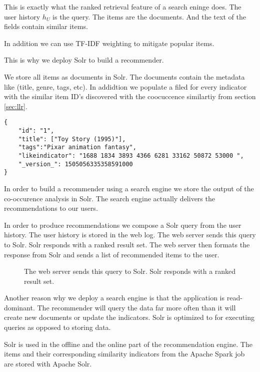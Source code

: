 This is exactly what the ranked retrieval feature of a search eninge does.
The user history $h_U$ is the query. The items are the documents. And the text of the fields contain similar items.

In addition we can use TF-IDF \cite{Manning} weighting to mitigate popular items.

This is why we deploy Solr to build a recommender.

We store all items as documents in Solr. The documents contain the metadata like (title, genre, tags, etc). In addidtion we populate a filed for every indicator with the similar item ID's discovered with the coocuccence similartiy from section \ref{sec:llr}.

\begin{lstlisting}[caption={Item metadata and similar items are stored in Solr.},label={lst:solrdoc}]
{
    "id": "1",
    "title": ["Toy Story (1995)"],
    "tags":"Pixar animation fantasy",
    "likeindicator": "1688 1834 3893 4366 6281 33162 50872 53000 ",
    "_version_": 1505056335358591000
}
\end{lstlisting}

In order to build a recommender using a search engine we store the output of the co-occurence analysis in Solr. The search engine actually delivers the recommendations to our users.

In order to produce recommendations we compose a Solr query from the user history. The user history is stored in the web log. The web server sends this query to Solr. Solr responds with a ranked result set. The web server then formats the response from Solr and sends a list of recommended items to the user.

\begin{figure}
\centering
{}
\caption{The web server sends this query to Solr. Solr responds with a ranked result set.}
\end{figure}


Another reason why we deploy a search engine is that the application is read-dominant. The recommender will query the data far more often than it will create new documents or update the indicators. Solr is optimized to for executing queries as opposed to storing data.

Solr is used in the offline and the online part of the recommendation engine.
The items and their corresponding similarity indicators from the Apache Spark job are stored with Apache Solr. 

